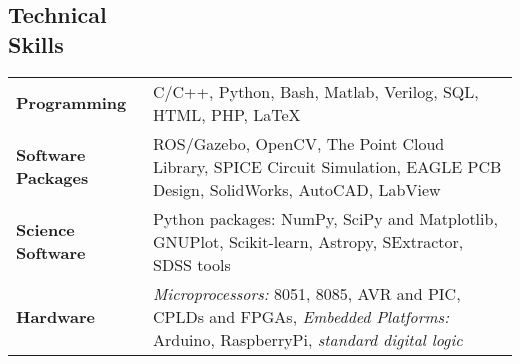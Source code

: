 \documentclass[margin,line]{res}
\begin{document}
\begin{resume}
\section{\sc Technical \\Skills} 
\begin{tabular}{@{}p{1.3in}p{4.3in}}
\textbf{Programming} & C/C++, Python, Bash, Matlab, Verilog, SQL, HTML, PHP, \LaTeX \\  
\vspace*{-0.06in}
\textbf{Software Packages} & 
\vspace*{-0.06in}
ROS/Gazebo, OpenCV, The Point Cloud Library, SPICE Circuit Simulation, EAGLE PCB Design, SolidWorks, AutoCAD, LabView\\ 
\vspace*{-0.06in}
\textbf{Science Software} &
\vspace*{-0.06in}
Python packages: NumPy, SciPy and Matplotlib, GNUPlot, Scikit-learn, Astropy, SExtractor, SDSS tools \\
\vspace*{-0.06in}
\textbf{Hardware} &
\vspace*{-0.06in}
\textit{Microprocessors:} 8051, 8085, AVR and PIC, CPLDs and FPGAs, \textit{Embedded Platforms:} Arduino, RaspberryPi, \textit{standard digital logic} \\     
\end{tabular}
%
%

\end{resume}
\end{document}
